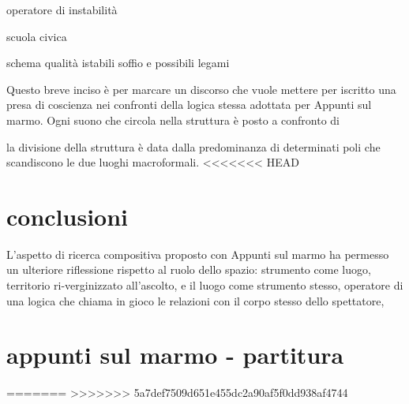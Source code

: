 operatore di instabilità

scuola civica



schema qualità istabili  soffio  e possibili legami








Questo breve inciso è per marcare un discorso che vuole mettere per iscritto una presa di coscienza nei confronti della logica stessa adottata per Appunti sul marmo.
Ogni suono che circola nella struttura è posto a confronto di

la divisione della struttura è data dalla predominanza di determinati poli che scandiscono  le due luoghi macroformali.
<<<<<<< HEAD

\part*{conclusioni}

L'aspetto di ricerca compositiva proposto con Appunti sul marmo ha permesso un ulteriore riflessione rispetto al ruolo dello spazio:
strumento come luogo, territorio ri-verginizzato all'ascolto, e il luogo come strumento stesso, operatore di una logica che chiama in gioco
le relazioni con il corpo stesso dello spettatore,

\part*{appunti sul marmo - partitura}
=======
>>>>>>> 5a7def7509d651e455dc2a90af5f0dd938af4744
